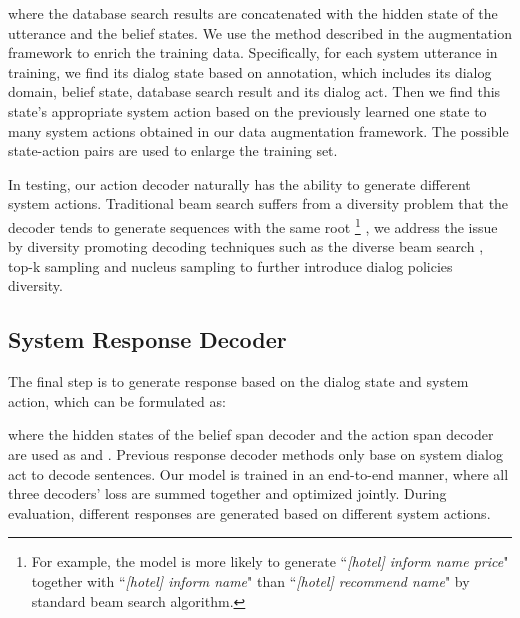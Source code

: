 \documentclass[letterpaper]{article} \usepackage{aaai20}  \usepackage{times}  \usepackage{helvet} \usepackage{courier}  \usepackage[hyphens]{url}  \usepackage{graphicx} \urlstyle{rm} \def\UrlFont{\rm}  \usepackage{graphicx}  \frenchspacing  \setlength{\pdfpagewidth}{8.5in}  \setlength{\pdfpageheight}{11in}  \usepackage{multirow}
\begin{document}
	where the database search results are concatenated with the hidden state of the utterance and the belief states.
	We use the method described in the augmentation framework to enrich the training data. Specifically, for each system utterance in training, we find its dialog state based on annotation, which includes its dialog domain, belief state, database search result and its dialog act. Then we find this state's appropriate system action based on the previously learned one state to many system actions obtained in our data augmentation framework. The possible state-action pairs are used to enlarge the training set.
	
	
	In testing, our action decoder naturally has the ability to generate different system actions. Traditional beam search suffers from a diversity problem that the decoder tends to generate sequences with the same root 
	\footnote{For example, the model is more likely to generate ``\textit{[hotel] inform name price}" together with ``\textit{[hotel] inform name}" than ``\textit{[hotel] recommend name}" by standard beam search algorithm.}
	\cite{finkel2006solving,li2016simple}, 
	we address the issue by diversity promoting decoding techniques such as the diverse beam search \cite{li2016simple}, top-k sampling \cite{fan2018hierarchical} and nucleus sampling \cite{holtzman2019curious} to further introduce dialog policies diversity.
	
	\subsection{System Response Decoder}
	The final step is to generate response based on the dialog state and system action, which can be formulated as:
	
	where the hidden states of the belief span decoder and the action span decoder are used as  and . 
	Previous response decoder methods only base on system dialog act to decode sentences.  
	Our model is trained in an end-to-end manner, where all three decoders' loss are summed together and optimized jointly. 
	During evaluation, different responses are generated based on different system actions.
	
	
\end{document}
